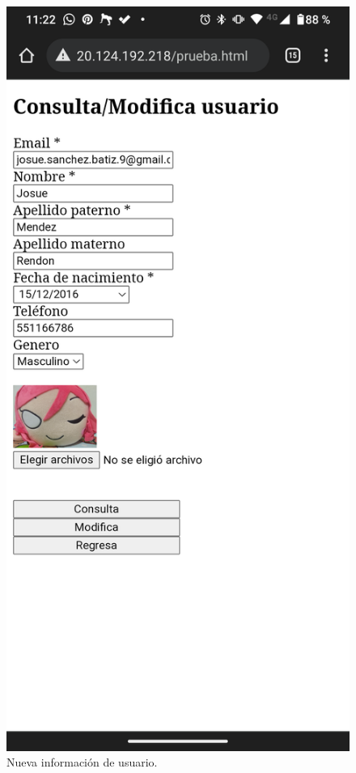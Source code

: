 \documentclass[11pt]{article}
\begin{document}
		\begin{figure}[H]
			\centering
			\includegraphics[scale=0.18]{resources/Screenshot_20211219-232248.png}
			\caption{Nueva información de usuario.}\label{fig:picture}
		\end{figure}
\end{document}
